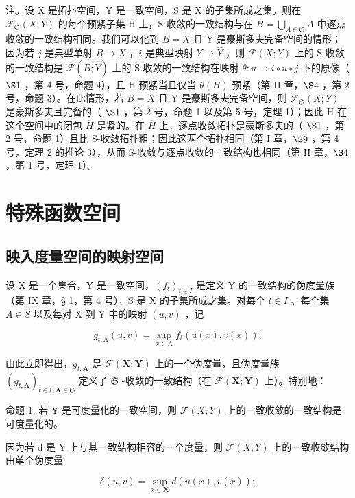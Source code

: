 注。设 X 是拓扑空间，Y 是一致空间，S 是 X 的子集所成之集。则在 \(\mathcal{F}_{\mathfrak{S}}(X;Y)\) 的每个预紧子集 H 上，S-收敛的一致结构与在 \(B = \bigcup_{A \in \mathfrak{S}} A\) 中逐点收敛的一致结构相同。我们可以化到 \(B = X\) 且 Y 是豪斯多夫完备空间的情形；因为若 \(j\) 是典型单射 \(B \to X\) ，\(i\) 是典型映射 \(Y \to \hat{Y}\) ，则 \(\mathcal{F}(X;Y)\) 上的 S-收敛的一致结构是 \(\mathcal{F}(B;\hat{Y})\) 上的 S-收敛的一致结构在映射 \(\theta : u \to i \circ u \circ j\) 下的原像（ \(\S 1\) ，第 4 号，命题 4），且 H 预紧当且仅当 \(\theta(H)\) 预紧（第 II 章，\(\S 4\) ，第 2 号，命题 3）。在此情形，若 \(B = X\) 且 Y 是豪斯多夫完备空间，则 \(\mathcal{F}_{\mathfrak{S}}(X;Y)\) 是豪斯多夫且完备的（ \(\S 1\) ，第 2 号，命题 1 以及第 5 号，定理 1）；因此 H 在这个空间中的闭包 \(\overline{H}\) 是紧的。在 \(\overline{H}\) 上，逐点收敛拓扑是豪斯多夫的（ \(\S 1\) ，第 2 号，命题 1）且比 S-收敛拓扑粗；因此这两个拓扑相同（第 I 章，\(\S 9\) ，第 4 号，定理 2 的推论 3），从而 S-收敛与逐点收敛的一致结构也相同（第 II 章，\(\S 4\) ，第 1 号，定理 1）。

\section{特殊函数空间}

\subsection{映入度量空间的映射空间}

设 X 是一个集合，Y 是一致空间，\((f_{t})_{t\in I}\) 是定义 Y 的一致结构的伪度量族（第 IX 章，§ 1，第 4 号），S 是 X 的子集所成之集。对每个 \(t\in I\) 、每个集 \(A\in S\) 以及每对 X 到 Y 中的映射 \((u,v)\) ，记

\[
g _ {t, \mathrm{A}} (u, v) = \sup _ {x \in \mathrm{A}} f _ {t} (u (x), v (x));
\]

由此立即得出，\(g_{t,\mathbf{A}}\) 是 \(\mathcal{F}(\mathbf{X};\mathbf{Y})\) 上的一个伪度量，且伪度量族 \((g_{t,\mathbf{A}})_{t\in \mathbf{I},\mathbf{A}\in \mathfrak{S}}\) 定义了 \(\mathfrak{S}\) -收敛的一致结构（在 \(\mathcal{F}(\mathbf{X};\mathbf{Y})\) 上）。特别地：

命题 1. 若 Y 是可度量化的一致空间，则 \(\mathcal{F}(X;Y)\) 上的一致收敛的一致结构是可度量化的。

因为若 d 是 Y 上与其一致结构相容的一个度量，则 \(\mathcal{F}(X;Y)\) 上的一致收敛结构由单个伪度量

\[
\delta (u, v) = \sup _ {x \in \mathbf {X}} d (u (x), v (x));
\]

